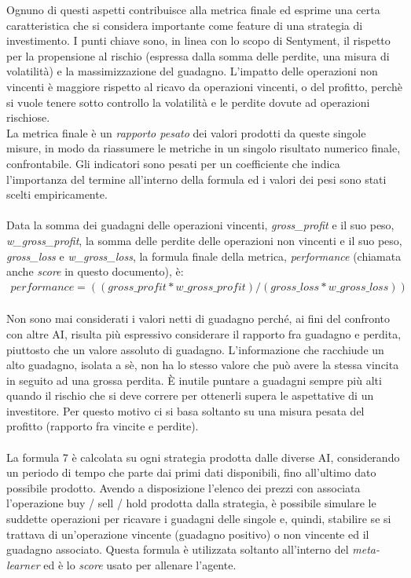 \documentclass[a4paper,12pt]{report}
\begin{document}
Ognuno di questi aspetti contribuisce alla metrica finale ed esprime una certa caratteristica che si considera importante come feature di una strategia di investimento. I punti chiave sono, in linea con lo scopo di Sentyment, il rispetto per la propensione al rischio (espressa dalla somma delle perdite, una misura di volatilità) e la massimizzazione del guadagno. L'impatto delle operazioni non vincenti è maggiore rispetto al ricavo da operazioni vincenti, o del profitto, perchè si vuole tenere sotto controllo la volatilità e le perdite dovute ad operazioni rischiose.\\ La metrica finale è un \textit{rapporto pesato} dei valori prodotti da queste singole misure, in modo da riassumere le metriche in un singolo risultato numerico finale, confrontabile. Gli indicatori sono pesati per un coefficiente che indica l'importanza del termine all'interno della formula ed i valori dei pesi sono stati scelti empiricamente.\\~\\Data la somma dei guadagni delle operazioni vincenti, \textit{gross\_profit} e il suo peso, \textit{w\_gross\_profit}, la somma delle perdite delle operazioni non vincenti e il suo peso, \textit{gross\_loss} e \textit{w\_gross\_loss}, la formula finale della metrica, \textit{performance} (chiamata anche \textit{score} in questo documento), è:
\begin{equation}
\begin{split}
performance=((gross\_profit*w\_gross\_profit)/(gross\_loss*w\_gross\_loss))
\end{split}
\end{equation} 
\\Non sono mai considerati i valori netti di guadagno perché, ai fini del confronto con altre AI, risulta più espressivo considerare il rapporto fra guadagno e perdita, piuttosto che un valore assoluto di guadagno. L'informazione che racchiude un alto guadagno, isolata a sè, non ha lo stesso valore che può avere la stessa vincita in seguito ad una grossa perdita. È inutile puntare a guadagni sempre più alti quando il rischio che si deve correre per ottenerli supera le aspettative di un investitore. Per questo motivo ci si basa soltanto su una misura pesata del profitto (rapporto fra vincite e perdite).\\~\\
La formula 7 è calcolata su ogni strategia prodotta dalle diverse AI, considerando un periodo di tempo che parte dai primi dati disponibili, fino all'ultimo dato possibile prodotto. Avendo a disposizione l'elenco dei prezzi con associata l'operazione buy / sell / hold prodotta dalla strategia, è possibile simulare le suddette operazioni per ricavare i guadagni delle singole e, quindi, stabilire se si trattava di un'operazione vincente (guadagno positivo) o non vincente ed il guadagno associato. Questa formula è utilizzata soltanto all'interno del \textit{meta-learner} ed è lo \textit{score} usato per allenare l'agente.
\end{document}
